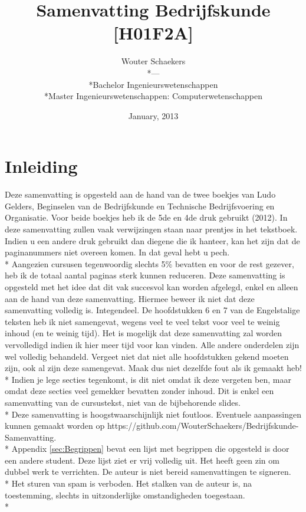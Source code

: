 \documentclass[12pt]{article}
\title{Samenvatting Bedrijfskunde [H01F2A]}
\author{Wouter Schaekers\\*---\\*Bachelor Ingenieurswetenschappen\\*Master Ingenieurswetenschappen: Computerwetenschappen}
\date{January, 2013}
\begin{document}
\maketitle
\setcounter{page}{0}
\setcounter{section}{-1}
\renewcommand{\contentsname}{Inhoudstafel}
\setcounter{tocdepth}{3}
\tableofcontents
\clearpage
\section{Inleiding}
Deze samenvatting is opgesteld aan de hand van de twee boekjes van Ludo Gelders, Beginselen van de Bedrijfskunde en Technische Bedrijfsvoering en Organisatie. Voor beide boekjes heb ik de 5de en 4de druk gebruikt (2012). In deze samenvatting zullen vaak verwijzingen staan naar prentjes in het tekstboek. Indien u een andere druk gebruikt dan diegene die ik hanteer, kan het zijn dat de paginanummers niet overeen komen. In dat geval hebt u pech.\\*
Aangezien cursusen tegenwoordig slechts 5\% bevatten en voor de rest gezever, heb ik de totaal aantal paginas sterk kunnen reduceren. Deze samenvatting is opgesteld met het idee dat dit vak succesvol kan worden afgelegd, enkel en alleen aan de hand van deze samenvatting. Hiermee beweer ik niet dat deze samenvatting volledig is. Integendeel. De hoofdstukken 6 en 7 van de Engelstalige teksten heb ik niet samengevat, wegens veel te veel tekst voor veel te weinig inhoud (en te weinig tijd). Het is mogelijk dat deze samenvatting zal worden vervolledigd indien ik hier meer tijd voor kan vinden. Alle andere onderdelen zijn wel volledig behandeld. Vergeet niet dat niet alle hoofdstukken gekend moeten zijn, ook al zijn deze samengevat. Maak dus niet dezelfde fout als ik gemaakt heb!\\*
Indien je lege secties tegenkomt, is dit niet omdat ik deze vergeten ben, maar omdat deze secties veel gemekker bevatten zonder inhoud.
Dit is enkel een samenvatting van de cursustekst, niet van de bijbehorende slides.\\*
Deze samenvatting is hoogstwaarschijnlijk niet foutloos. Eventuele aanpassingen kunnen gemaakt worden op https://github.com/WouterSchaekers/Bedrijfskunde-Samenvatting.\\*
Appendix \ref{sec:Begrippen} bevat een lijst met begrippen die opgesteld is door een andere student. Deze lijst ziet er vrij volledig uit. Het heeft geen zin om dubbel werk te verrichten.
\clearpage
\noindent De auteur is niet bereid samenvattingen te signeren.\\*
Het sturen van spam is verboden. Het stalken van de auteur is, na toestemming, slechts in uitzonderlijke omstandigheden toegestaan.\\*
\end{document}

